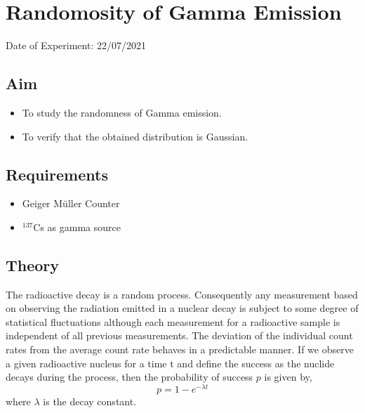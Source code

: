 


	
	\chapter{Randomosity of Gamma Emission} %
	\vspace{-1cm}
	
	\begin{center}%
		Date of Experiment: 22/07/2021
	\end{center}
	
	
	\section{Aim}
	\begin{itemize}
		
		\item To study the randomness of Gamma emission.
		\item To verify that the obtained distribution is Gaussian.
	\end{itemize}
	
	\section{Requirements}
	\begin{itemize}
		\item 	Geiger M{\"u}ller Counter
		\item 	$ ^{137} $Cs as gamma source
	\end{itemize}
	
	\section{Theory}
	The radioactive decay is a random process. Consequently any measurement based on observing the radiation emitted in a nuclear decay is subject to some degree of statistical fluctuations although each measurement for a radioactive sample is independent of all previous measurements. The deviation of the individual count rates from the average count rate behaves in a predictable manner. If we observe a given radioactive nucleus for a time t and define the success as the nuclide decays during the process, then the probability of success $ p $ is given by, 
	\begin{equation} 
		p = 1-e^{-\lambda t}
	\end{equation}  where $\lambda$ is the decay constant. \\
	
